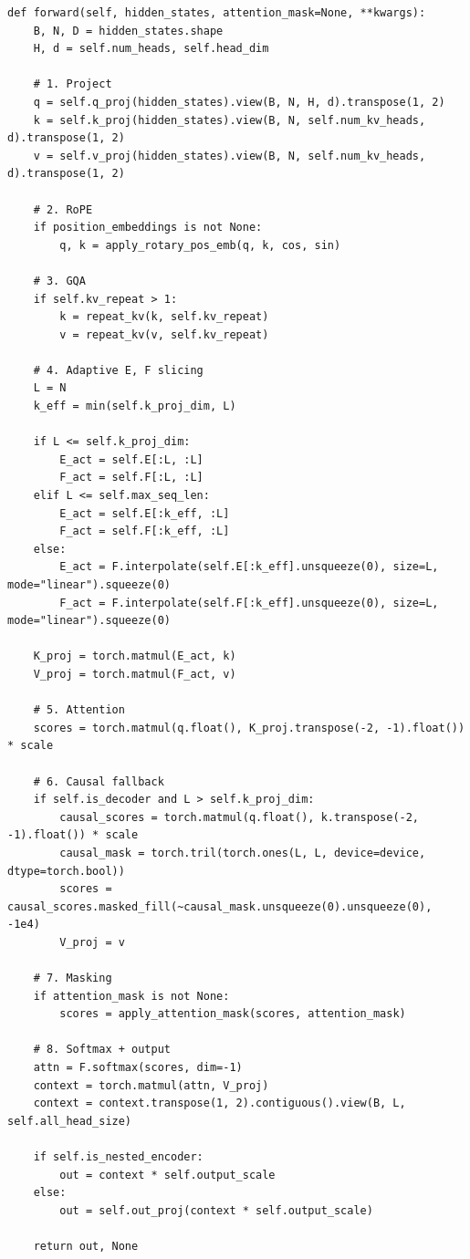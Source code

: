 \begin{lstlisting}
def forward(self, hidden_states, attention_mask=None, **kwargs):
    B, N, D = hidden_states.shape
    H, d = self.num_heads, self.head_dim
    
    # 1. Project
    q = self.q_proj(hidden_states).view(B, N, H, d).transpose(1, 2)
    k = self.k_proj(hidden_states).view(B, N, self.num_kv_heads, d).transpose(1, 2)
    v = self.v_proj(hidden_states).view(B, N, self.num_kv_heads, d).transpose(1, 2)
    
    # 2. RoPE
    if position_embeddings is not None:
        q, k = apply_rotary_pos_emb(q, k, cos, sin)
    
    # 3. GQA
    if self.kv_repeat > 1:
        k = repeat_kv(k, self.kv_repeat)
        v = repeat_kv(v, self.kv_repeat)
    
    # 4. Adaptive E, F slicing
    L = N
    k_eff = min(self.k_proj_dim, L)
    
    if L <= self.k_proj_dim:
        E_act = self.E[:L, :L]
        F_act = self.F[:L, :L]
    elif L <= self.max_seq_len:
        E_act = self.E[:k_eff, :L]
        F_act = self.F[:k_eff, :L]
    else:
        E_act = F.interpolate(self.E[:k_eff].unsqueeze(0), size=L, mode="linear").squeeze(0)
        F_act = F.interpolate(self.F[:k_eff].unsqueeze(0), size=L, mode="linear").squeeze(0)
    
    K_proj = torch.matmul(E_act, k)
    V_proj = torch.matmul(F_act, v)
    
    # 5. Attention
    scores = torch.matmul(q.float(), K_proj.transpose(-2, -1).float()) * scale
    
    # 6. Causal fallback
    if self.is_decoder and L > self.k_proj_dim:
        causal_scores = torch.matmul(q.float(), k.transpose(-2, -1).float()) * scale
        causal_mask = torch.tril(torch.ones(L, L, device=device, dtype=torch.bool))
        scores = causal_scores.masked_fill(~causal_mask.unsqueeze(0).unsqueeze(0), -1e4)
        V_proj = v
    
    # 7. Masking
    if attention_mask is not None:
        scores = apply_attention_mask(scores, attention_mask)
    
    # 8. Softmax + output
    attn = F.softmax(scores, dim=-1)
    context = torch.matmul(attn, V_proj)
    context = context.transpose(1, 2).contiguous().view(B, L, self.all_head_size)
    
    if self.is_nested_encoder:
        out = context * self.output_scale
    else:
        out = self.out_proj(context * self.output_scale)
    
    return out, None
\end{lstlisting}

